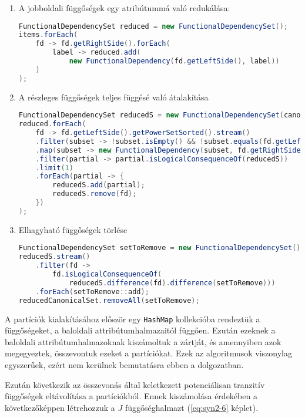 \begin{enumerate}

    \item A jobboldali függőségek egy atribútummá való redukálása:
    
\linespread{1}
\begin{lstlisting}[language=Java]
FunctionalDependencySet reduced = new FunctionalDependencySet();
items.forEach(
	fd -> fd.getRightSide().forEach(
		label -> reduced.add(
			new FunctionalDependency(fd.getLeftSide(), label))
	)
);
\end{lstlisting}

    \item A részleges függőségek teljes függésé való átalakítása
    
\linespread{1}
\begin{lstlisting}[language=Java]
FunctionalDependencySet reducedS = new FunctionalDependencySet(canonicalSet);
reduced.forEach(
	fd -> fd.getLeftSide().getPowerSetSorted().stream()
	.filter(subset -> !subset.isEmpty() && !subset.equals(fd.getLeftSide()))
	.map(subset -> new FunctionalDependency(subset, fd.getRightSide()))
	.filter(partial -> partial.isLogicalConsequenceOf(reducedS))
	.limit(1)
	.forEach(partial -> {
		reducedS.add(partial);
		reducedS.remove(fd);
	})
);
\end{lstlisting}

    \item Elhagyható függőségek törlése
    
\linespread{1}
\begin{lstlisting}[language=Java]
FunctionalDependencySet setToRemove = new FunctionalDependencySet();
reducedS.stream()
	.filter(fd ->
		fd.isLogicalConsequenceOf(
			reducedS.difference(fd).difference(setToRemove)))
	.forEach(setToRemove::add);
reducedCanonicalSet.removeAll(setToRemove);
\end{lstlisting}
\end{enumerate}

A partíciók kialakításához először egy \lstinline{HashMap} kollekcióba rendeztük a függőségeket, a baloldali attribútumhalmazaitól függően. Ezután ezeknek a baloldali attribútumhalmazoknak kiszámoltuk a zártját, és amennyiben azok megegyeztek, összevontuk ezeket a partíciókat. Ezek az algoritmusok viszonylag egyszerűek, ezért nem kerülnek bemutatásra ebben a dolgozatban.

Ezután következik az összevonás által keletkezett potenciálisan tranzitív függőségek eltávolítása a partíciókból. Ennek kiszámolása érdekében a következőképpen létrehozzuk a $J$ függőséghalmazt (\ref{eq:syn2-6} képlet).

